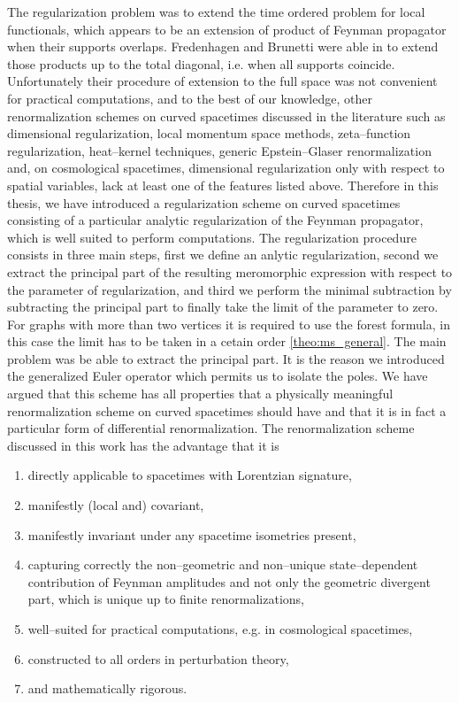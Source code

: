 \documentclass[11pt]{book}
\theoremstyle{break}
\begin{document}
The regularization problem was to extend the time ordered problem for local functionals, which appears to be an extension of product of Feynman propagator when their supports overlaps. Fredenhagen and Brunetti were able in \cite{BF_2000} to extend those products up to the total diagonal, i.e. when all supports coincide. Unfortunately their procedure of extension to the full space was not convenient for practical computations, and to the best of our knowledge, other renormalization schemes on curved spacetimes discussed in the literature such as dimensional regularization, local momentum space methods, zeta--function regularization, heat--kernel techniques, generic Epstein--Glaser renormalization and, on cosmological spacetimes, dimensional regularization only with respect to spatial variables, lack at least one of the features listed above. Therefore in this thesis, we have introduced a regularization scheme on curved spacetimes consisting of a particular analytic regularization of the Feynman propagator, which is well suited to perform computations. The regularization procedure consists in three main steps, first we define an anlytic regularization, second we extract the principal part of the resulting meromorphic expression with respect to the parameter of regularization, and third we perform the minimal subtraction by subtracting the principal part to finally take the limit of the parameter to zero. For graphs with more than two vertices it is required to use the forest formula, in this case the limit has to be taken in a cetain order \ref{theo:ms_general}. The main problem was be able to extract the principal part. It is the reason we introduced the generalized Euler operator which permits us to isolate the poles. We have argued that this scheme has all properties that a physically meaningful renormalization scheme on curved spacetimes should have and that it is in fact a particular form of differential renormalization. The renormalization scheme discussed in this work has the advantage that it is 
%
\begin{enumerate}
\item directly applicable to spacetimes with Lorentzian signature, 
\item manifestly (local and) covariant, 
\item manifestly invariant under any spacetime isometries present,
\item capturing correctly the non--geometric and non--unique state--dependent contribution of Feynman amplitudes and not only the geometric divergent part, which is unique up to finite renormalizations,
\item well--suited for practical computations, e.g. in cosmological spacetimes,
\item constructed to all orders in perturbation theory,
\item and mathematically rigorous.
\end{enumerate}
\end{document}
